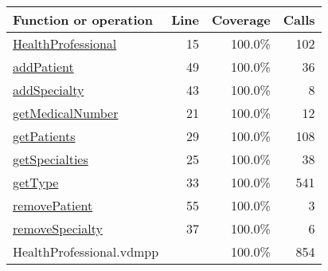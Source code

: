 \bigskip
\begin{longtable}{|l|r|r|r|}
\hline
Function or operation & Line & Coverage & Calls \\
\hline
\hline
\hyperref[HealthProfessional:15]{HealthProfessional} & 15&100.0\% & 102 \\
\hline
\hyperref[addPatient:49]{addPatient} & 49&100.0\% & 36 \\
\hline
\hyperref[addSpecialty:43]{addSpecialty} & 43&100.0\% & 8 \\
\hline
\hyperref[getMedicalNumber:21]{getMedicalNumber} & 21&100.0\% & 12 \\
\hline
\hyperref[getPatients:29]{getPatients} & 29&100.0\% & 108 \\
\hline
\hyperref[getSpecialties:25]{getSpecialties} & 25&100.0\% & 38 \\
\hline
\hyperref[getType:33]{getType} & 33&100.0\% & 541 \\
\hline
\hyperref[removePatient:55]{removePatient} & 55&100.0\% & 3 \\
\hline
\hyperref[removeSpecialty:37]{removeSpecialty} & 37&100.0\% & 6 \\
\hline
\hline
HealthProfessional.vdmpp & & 100.0\% & 854 \\
\hline
\end{longtable}

